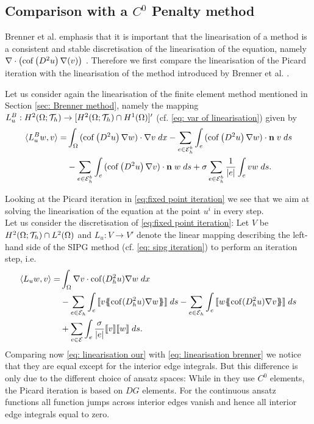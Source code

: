 \subsection{Comparison with a $C^0$ Penalty method}\label{subsec: comparison brenner}
Brenner et al. emphasis that it is important that the linearisation of a \MA method is a consistent and stable discretisation of the linearisation of the \MA equation, namely $\nabla \cdot \left( \operatorname{cof} \left( D^2 u  \right) \nabla (v) \right)$ \cite[Remark 2.2]{BGN+2011}.
Therefore we first compare the linearisation of the Picard iteration with the linearisation of the method introduced by Brenner et al. \cite{BGN+2011}.

Let us consider again the linearisation of the finite element method mentioned in Section \ref{sec: Brenner method}, namely the mapping $L^B_u:H^2(\Omega; \mathcal{T}_h) \rightarrow [H^2(\Omega; \mathcal{T}_h) \cap H^1(\Omega)]'$ (cf. \eqref{eq: var of linearisation}) given by
\begin{align}
 \langle L^B_{u} w, v \rangle
	=&\int_{\Omega} {{ (\operatorname{cof} \left( D^2  u \right)\nabla w) \cdot \nabla v}\;dx}
		- \sum_{e \in \mathcal{E}_h^b} \int_{e} {{ (\operatorname{cof} \left( D^2 u \right)\nabla w) \cdot \mathbf n \; v}\;ds} \nonumber \\
		&-  \sum_{e \in \mathcal{E}_h^b} \int_{e} {{ (\operatorname{cof} \left( D^2 u \right)\nabla v) \cdot \mathbf n \; w}\;ds} 
		+ \sigma \sum_{e \in \mathcal{E}_h^b} \frac 1 {|e|} \int_{e} {{ v w}\;ds}.
		\label{eq: linearisation brenner}
\end{align}


Looking at the Picard iteration in \eqref{eq:fixed point iteration} we see that we aim at solving the linearisation of the \MA equation at the point $u^i$ in every step.\\
Let us consider the discretisation of \eqref{eq:fixed point iteration}: Let $V$ be $H^2(\Omega; \mathcal{T}_h) \cap L^2(\Omega)$ and $L_u: V \rightarrow V'$ denote the linear mapping describing the left-hand side of the SIPG method (cf. \eqref{eq: sipg iteration}) to perform an iteration step, i.e.
\begin{align}
	\bilin {L_u w} v =
 &\myIntX  \Omega { \nabla v \cdot \cof(D_h^2 u) \nabla w } \nonumber\\
 & -\sum\limits_{e \in \edges}\myIntS e { \jump {v \average { \cof(D_h^2 u) \nabla w} }}
 - \sum\limits_{e \in \edges}\myIntS e { \jump {w \average{ \cof(D_h^2 u) \nabla v} }} \nonumber\\  
 & +\sum\limits_{e \in \bigEps} \myIntS e { \frac \sigma {|e|} \jump {v}  \jump {w}}. \label{eq: linearisation our}
\end{align}
Comparing now \eqref{eq: linearisation our} with \eqref{eq: linearisation brenner} we notice that they are equal except for the interior edge integrals. But this difference is only due to the different choice of ansatz spaces: While in \cite{BGN+2011} they use $C^0$ elements, the Picard iteration is based on $DG$ elements. For the continuous ansatz functions all function jumps across interior edges vanish and hence all interior edge integrals equal to zero.

